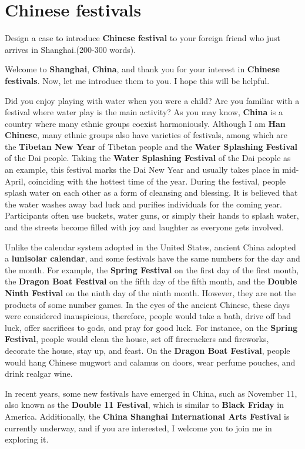 \section{Chinese festivals}

\begin{question}{}{}
    Design a case to introduce \textbf{Chinese festival} to your foreign friend who just arrives in Shanghai.(200-300 words).
\end{question}

Welcome to \textbf{Shanghai}, \textbf{China}, and thank you for your interest in \textbf{Chinese festivals}. Now, let me introduce them to you. I hope this will be helpful.

Did you enjoy playing with water when you were a child? Are you familiar with a festival where water play is the main activity? As you may know, \textbf{China} is a country where many ethnic groups coexist harmoniously. Although I am \textbf{Han Chinese}, many ethnic groups also have varieties of festivals, among which are the \textbf{Tibetan New Year} of Tibetan people and the \textbf{Water Splashing Festival} of the Dai people. Taking the \textbf{Water Splashing Festival} of the Dai people as an example, this festival marks the Dai New Year and usually takes place in mid-April, coinciding with the hottest time of the year. During the festival, people splash water on each other as a form of cleansing and blessing. It is believed that the water washes away bad luck and purifies individuals for the coming year. Participants often use buckets, water guns, or simply their hands to splash water, and the streets become filled with joy and laughter as everyone gets involved.

Unlike the calendar system adopted in the United States, ancient China adopted a \textbf{lunisolar calendar}, and some festivals have the same numbers for the day and the month. For example, the \textbf{Spring Festival} on the first day of the first month, the \textbf{Dragon Boat Festival} on the fifth day of the fifth month, and the \textbf{Double Ninth Festival} on the ninth day of the ninth month. However, they are not the products of some number games. In the eyes of the ancient Chinese, these days were considered inauspicious, therefore, people would take a bath, drive off bad luck, offer sacrifices to gods, and pray for good luck. For instance, on the \textbf{Spring Festival}, people would clean the house, set off firecrackers and fireworks, decorate the house, stay up, and feast. On the \textbf{Dragon Boat Festival}, people would hang Chinese mugwort and calamus on doors, wear perfume pouches, and drink realgar wine.

In recent years, some new festivals have emerged in China, such as November 11, also known as the \textbf{Double 11 Festival}, which is similar to \textbf{Black Friday} in America. Additionally, the \textbf{China Shanghai International Arts Festival} is currently underway, and if you are interested, I welcome you to join me in exploring it.